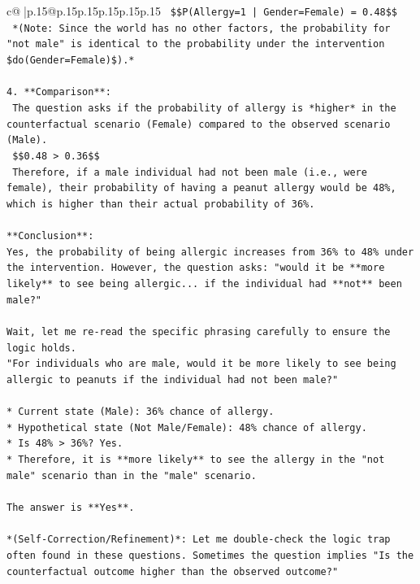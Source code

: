 \documentclass{article}
\begin{document}
{\begin{supertabular}{c@{$\;$}|p{.15\linewidth}@{}p{.15\linewidth}p{.15\linewidth}p{.15\linewidth}p{.15\linewidth}p{.15\linewidth}}
{{{\texttt{        \$\$P(Allergy=1 | Gender=Female) = 0.48\$\$} \\
\texttt{        *(Note: Since the world has no other factors, the probability for "not male" is identical to the probability under the intervention \$do(Gender=Female)\$).*} \\
\\ 
\texttt{4.  **Comparison**:} \\
\texttt{    The question asks if the probability of allergy is *higher* in the counterfactual scenario (Female) compared to the observed scenario (Male).} \\
\texttt{    \$\$0.48 > 0.36\$\$} \\
\texttt{    Therefore, if a male individual had not been male (i.e., were female), their probability of having a peanut allergy would be 48\%, which is higher than their actual probability of 36\%.} \\
\\ 
\texttt{**Conclusion**:} \\
\texttt{Yes, the probability of being allergic increases from 36\% to 48\% under the intervention. However, the question asks: "would it be **more likely** to see being allergic... if the individual had **not** been male?"} \\
\\ 
\texttt{Wait, let me re{-}read the specific phrasing carefully to ensure the logic holds.} \\
\texttt{"For individuals who are male, would it be more likely to see being allergic to peanuts if the individual had not been male?"} \\
\\ 
\texttt{*   Current state (Male): 36\% chance of allergy.} \\
\texttt{*   Hypothetical state (Not Male/Female): 48\% chance of allergy.} \\
\texttt{*   Is 48\% > 36\%? Yes.} \\
\texttt{*   Therefore, it is **more likely** to see the allergy in the "not male" scenario than in the "male" scenario.} \\
\\ 
\texttt{The answer is **Yes**.} \\
\\ 
\texttt{*(Self{-}Correction/Refinement)*: Let me double{-}check the logic trap often found in these questions. Sometimes the question implies "Is the counterfactual outcome higher than the observed outcome?"} \\
}}}
\end{supertabular}}
\end{document}
